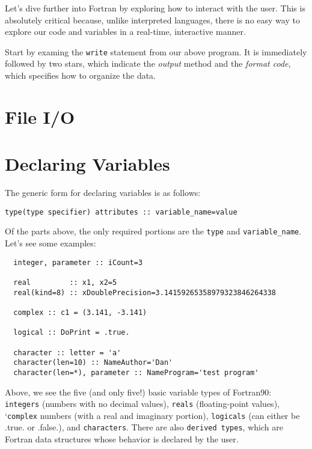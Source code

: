 \documentclass[11pt, letterpaper]{article}
\begin{document}
Let's dive further into Fortran by exploring how to interact with the user.
This is absolutely critical because, unlike interpreted languages, there is
no easy way to explore our code and variables in a real-time, interactive
manner.

Start by examing the {\tt write} statement from our above program.
It is immediately followed by two stars, which indicate the \emph{output}
method and the \emph{format code}, which specifies how to organize the
data.

\section{File I/O}

\section{Declaring Variables}

The generic form for declaring variables is as follows:
\begin{verbatim}
type(type specifier) attributes :: variable_name=value
\end{verbatim}
Of the parts above, the only required portions are the {\tt type} and
{\tt variable\_name}.  Let's see some examples:

\begin{verbatim}
  integer, parameter :: iCount=3

  real         :: x1, x2=5
  real(kind=8) :: xDoublePrecision=3.14159265358979323846264338
  
  complex :: c1 = (3.141, -3.141)

  logical :: DoPrint = .true.

  character :: letter = 'a'
  character(len=10) :: NameAuthor='Dan' 
  character(len=*), parameter :: NameProgram='test program'
\end{verbatim}

Above, we see the five (and only five!) basic variable types of Fortran90:
{\tt integers} (numbers with no decimal values), {\tt reals} (floating-point
values), `{\tt complex} numbers (with a real and imaginary portion),
{\tt logicals} (can either be .true. or .false.), and {\tt characters}.  There
are also {\tt derived types}, which are Fortran data structures whose
behavior is declared by the user.
\end{document}
